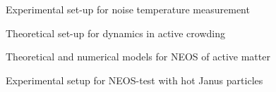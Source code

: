 \begin{workpackage}
\begin{tasklist}
\end{tasklist}

\printbibliography[heading=proposal-bib,env=proposal-env]

\begin{wpdelivs}
\begin{wpdeliv}[due=12,id=D2.3,dissem=PU,nature=DEM,lead=Leipzig]
      {Experimental set-up for noise temperature measurement}
  \end{wpdeliv}
  \begin{wpdeliv}[due=24,id=D2.1,dissem=PU,nature=DEM,lead=Leipzig]
      {Theoretical set-up for dynamics in active crowding}
  \end{wpdeliv}
  \begin{wpdeliv}[due=24,id=D2.2,dissem=PU,nature=DEM,lead=Leipzig]
      {Theoretical and numerical models for NEOS of active matter}
\end{wpdeliv}
  \begin{wpdeliv}[due=36,id=D2.4,dissem=PU,nature=DEM,lead=Leipzig]
      {Experimental setup for NEOS-test with hot Janus particles}
\end{wpdeliv}
\end{wpdelivs}

\end{workpackage}

